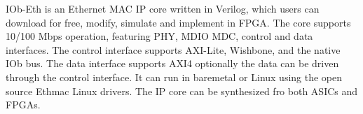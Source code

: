 %

IOb-Eth is an Ethernet MAC IP core written in Verilog, which users can download
for free, modify, simulate and implement in FPGA.  The core supports 10/100 Mbps
operation, featuring PHY, MDIO MDC, control and data interfaces. The control
interface supports AXI-Lite, Wishbone, and the native IOb bus. The data
interface supports AXI4 optionally the data can be driven through the control
interface. It can run in baremetal or Linux using the open source Ethmac Linux
drivers. The IP core can be synthesized fro both ASICs and FPGAs.
